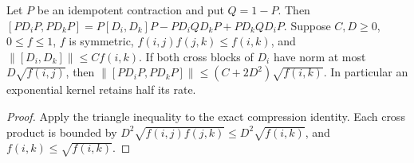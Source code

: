 \begin{lemma}
    \label{thm:hastings05_split_compression_decay}
    \leanok
    Let $P$ be an idempotent contraction and put $Q=1-P$.
    Then $[PD_iP,PD_kP]=P[D_i,D_k]P-PD_iQD_kP+PD_kQD_iP$.
    Suppose $C,D\ge0$, $0\le f\le1$, $f$ is symmetric,
    $f(i,j)f(j,k)\le f(i,k)$, and $\|[D_i,D_k]\|\le Cf(i,k)$.
    If both cross blocks of $D_i$ have norm at most $D\sqrt{f(i,j)}$,
    then $\|[PD_iP,PD_kP]\|\le(C+2D^2)\sqrt{f(i,k)}$.
    In particular an exponential kernel retains half its rate.
\end{lemma}
\begin{proof}\leanok
    Apply the triangle inequality to the exact compression identity.
    Each cross product is bounded by
    $D^2\sqrt{f(i,j)f(j,k)}\le D^2\sqrt{f(i,k)}$, and
    $f(i,k)\le\sqrt{f(i,k)}$.
\end{proof}

